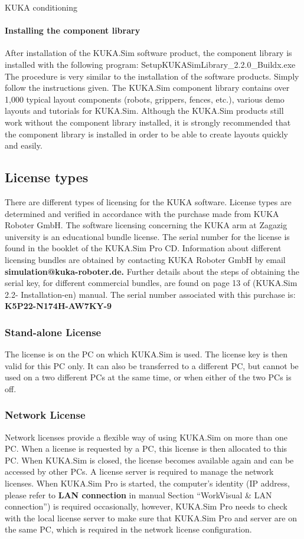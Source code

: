 \documentclass{book}
\begin{document}
\begin{chapter}{KUKA conditioning}
 	\paragraph{Installing the component library }
 	After installation of the KUKA.Sim software product, the component library is installed with the following program: SetupKUKASimLibrary\_2.2.0\_Buildx.exe The procedure is very similar to the installation of the software products. Simply follow the instructions given.
 	The KUKA.Sim component library contains over 1,000 typical layout components (robots, grippers, fences, etc.), various demo layouts and tutorials for KUKA.Sim. Although the KUKA.Sim products still work without the component library installed, it is strongly recommended that the component library is installed in order to be able to create layouts quickly and easily.
 	
 	\subsection{License types}
 	There are different types of licensing for the KUKA software. License types are determined and verified in accordance with the purchase made from KUKA Roboter GmbH. 
 	The software licensing concerning the KUKA arm at Zagazig university is an educational bundle license. The serial number for the license is found in the booklet of the KUKA.Sim Pro CD. Information about different licensing bundles are obtained by contacting KUKA Roboter GmbH by email
 	\textbf {simulation@kuka-roboter.de.}
 	Further details about the steps of obtaining the serial key, for different commercial bundles,  are found on page 13 of (KUKA.Sim 2.2- Installation-en) manual.
 	The serial number associated with this purchase is: \textbf {K5P22-N174H-AW7KY-9}
 	
 		\subsubsection{Stand-alone License}
 		The license is on the PC on which KUKA.Sim is used. The license key is then valid for this PC only. It can also be transferred to a different PC, but cannot be used on a two different PCs at the same time, or when either of the two PCs is off.
 		
 		\subsubsection{Network License}
 		Network licenses provide a flexible way of using KUKA.Sim on more than one PC. When a license is requested by a PC, this license is then allocated to this PC. When KUKA.Sim is closed, the license becomes available again and can be accessed by other PCs. 
 		A license server is required to manage the network licenses. When KUKA.Sim Pro is started, the computer’s identity (IP address, please refer to \textbf {LAN connection} in manual Section “WorkVisual \& LAN connection”) is required occasionally, however, KUKA.Sim Pro needs to check with the local license server to make sure that KUKA.Sim Pro and server are on the same PC, which is required in the network license configuration.
 	

\end{chapter}
\end{document}
